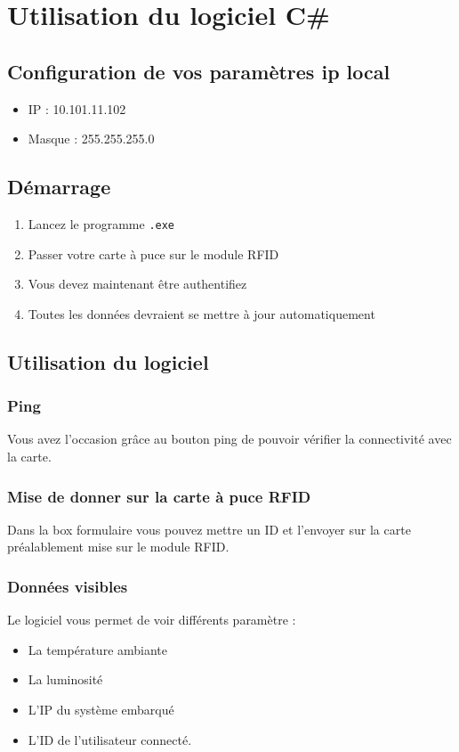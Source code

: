 \documentclass[12pt,a4paper]{report}
\begin{document}
\chapter{Utilisation du logiciel C\#}
	\section{Configuration de vos paramètres ip local}
		\begin{itemize}
			\item IP : 10.101.11.102
			\item Masque : 255.255.255.0
		\end{itemize}
	\section{Démarrage}
		\begin{enumerate}
			\item Lancez le programme \verb+.exe+
			\item Passer votre carte à puce sur le module RFID
			\item Vous devez maintenant être authentifiez
			\item Toutes les données devraient se mettre à jour automatiquement
		\end{enumerate}
	\section{Utilisation du logiciel}
		\subsection{Ping}
			Vous avez l'occasion grâce au bouton ping de pouvoir vérifier la connectivité avec la carte.
		\subsection{Mise de donner sur la carte à puce RFID}
			Dans la box formulaire vous pouvez mettre un ID et l'envoyer sur la carte préalablement mise sur le module RFID.
		\subsection{Données visibles}
			Le logiciel vous permet de voir différents paramètre :
			\begin{itemize}
			\item La température ambiante
			\item La luminosité
			\item L'IP du système embarqué
			\item L'ID de l'utilisateur connecté.
			\end{itemize}
			
	
\end{document}
